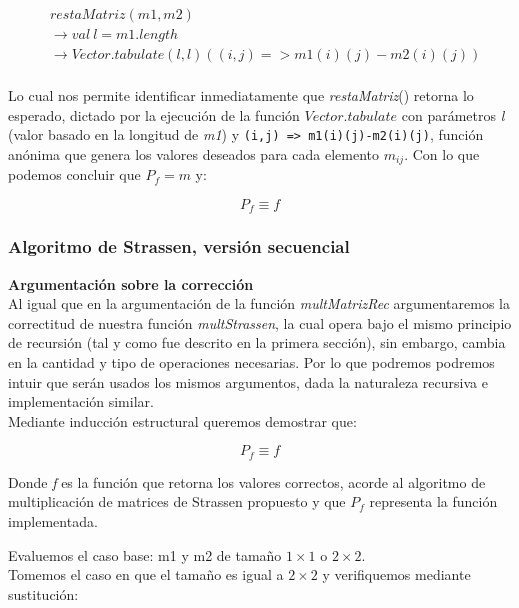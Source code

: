\documentclass{article}
\begin{document}
\begin{align*}
    &restaMatriz(m1, m2)\\
    &\rightarrow val \ l = m1.length\\
    &\rightarrow Vector.tabulate(l,l)((i,j) => m1(i)(j)-m2(i)(j))\\
\end{align*}

Lo cual nos permite identificar inmediatamente que \textit{restaMatriz}() retorna lo esperado, dictado por la ejecución de la función \(Vector.tabulate\) con parámetros \textit{l} (valor basado en la longitud de \textit{m1}) y \verb|(i,j) => m1(i)(j)-m2(i)(j)|, función anónima que genera los valores deseados para cada elemento \(m_{ij}\). Con lo que podemos concluir que \(P_f = m\) y:

\begin{equation*}
    P_f \equiv f
\end{equation*}

\subsubsection{Algoritmo de Strassen, versión secuencial}

\textbf{Argumentación sobre la corrección}\\

Al igual que en la argumentación de la función \textit{multMatrizRec} argumentaremos la correctitud de nuestra función \textit{multStrassen}, la cual opera bajo el mismo principio de recursión (tal y como fue descrito en la primera sección), sin embargo, cambia en la cantidad y tipo de operaciones necesarias. Por lo que podremos podremos intuir que serán usados los mismos argumentos, dada la naturaleza recursiva e implementación similar.\\

Mediante inducción estructural queremos demostrar que:

\begin{equation*}
    P_f \equiv f
\end{equation*}

Donde \textit{f} es la función que retorna los valores correctos, acorde al algoritmo de multiplicación de matrices de Strassen propuesto y que \(P_f\) representa la función implementada.

Evaluemos el caso base: m1 y m2 de tamaño \(1 \times 1\) o \(2 \times 2\). \\

Tomemos el caso en que el tamaño es igual a \(2 \times 2\) y verifiquemos mediante sustitución:
\end{document}
